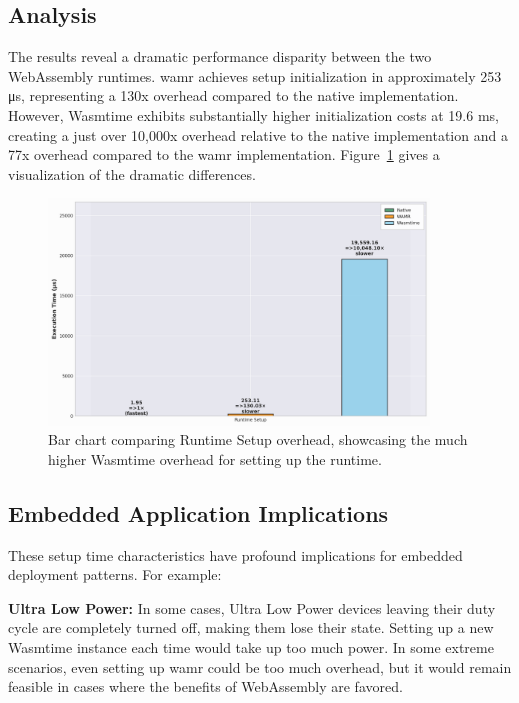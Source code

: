\subsection{Analysis}
The results reveal a dramatic performance disparity between the two WebAssembly runtimes. \acrshort{wamr} achieves setup initialization in approximately 253 μs, representing a 130x overhead compared to the native implementation. However, Wasmtime exhibits substantially higher initialization costs at 19.6 ms, creating a just over 10,000x overhead relative to the native implementation and a 77x overhead compared to the \acrshort{wamr} implementation. Figure~\ref{fig:wasm-setup-relative} gives a visualization of the dramatic differences.

\begin{figure}[h]
    \centering
    \includegraphics[width=0.9\textwidth]{images/setup_bars}
    \caption{Bar chart comparing Runtime Setup overhead, showcasing the much higher Wasmtime overhead for setting up the runtime.}
    \label{fig:wasm-setup-relative}
\end{figure}

\subsection{Embedded Application Implications}
\label{subsec:setup-implications}

These setup time characteristics have profound implications for embedded deployment patterns. For example:

\textbf{Ultra Low Power:} In some cases, Ultra Low Power devices leaving their duty cycle are completely turned off, making them lose their state. Setting up a new Wasmtime instance each time would take up too much power. In some extreme scenarios, even setting up \acrshort{wamr} could be too much overhead, but it would remain feasible in cases where the benefits of WebAssembly are favored.

